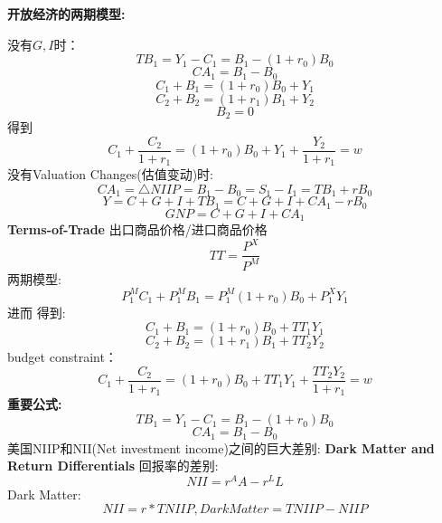 \documentclass[UTF8, onecolumn, a4paper, 12pt]{article}
\begin{document}
\textbf{开放经济的两期模型:}

没有$G, I$时：
$$TB_1 = Y_1 - C_1 = B_1 - (1+r_0)B_0$$
$$CA_1 = B_1 - B_0$$
$$C_1+B_1 = (1+r_0)B_0 + Y_1$$
$$C_2+B_2 = (1+r_1)B_1 + Y_2$$
$$B_2 = 0$$
得到
$$C_1 +\frac{C_2}{1+r_1} = (1+r_0)B_0 + Y_1 + \frac{Y_2}{1+r_1} = w$$
没有Valuation Changes(估值变动)时:
$$CA_1 = \triangle NIIP = B_1 - B_0 = S_1 - I_1 = TB_1 + rB_0$$
$$Y = C + G + I + TB_1 = C+G+I + CA_1 - rB_0$$
$$GNP = C+G+I+CA_1$$
\textbf{Terms-of-Trade}
出口商品价格/进口商品价格
$$TT = \frac{P^X}{P^M}$$
两期模型:
$$P_1^MC_1 + P_1^MB_1 = P_1^M(1+r_0)B_0 + P_1^XY_1$$
进而 得到:
$$C_1+B_1 = (1+r_0)B_0 + TT_1Y_1$$
$$C_2+B_2 = (1+r_1)B_1 + TT_2Y_2$$
budget constraint：
$$C_1 +\frac{C_2}{1+r_1} = (1+r_0)B_0 + TT_1Y_1 + \frac{TT_2Y_2}{1+r_1} = w$$
\textbf{重要公式:}
$$TB_1 = Y_1 - C_1 = B_1 - (1+r_0)B_0$$
$$CA_1 = B_1 - B_0$$
美国NIIP和NII(Net investment income)之间的巨大差别:
\textbf{Dark Matter and Return Differentials}
回报率的差别:
$$NII = r^AA - r^LL$$
Dark Matter:
$$NII = r*TNIIP, DarkMatter = TNIIP - NIIP$$
\end{document}
